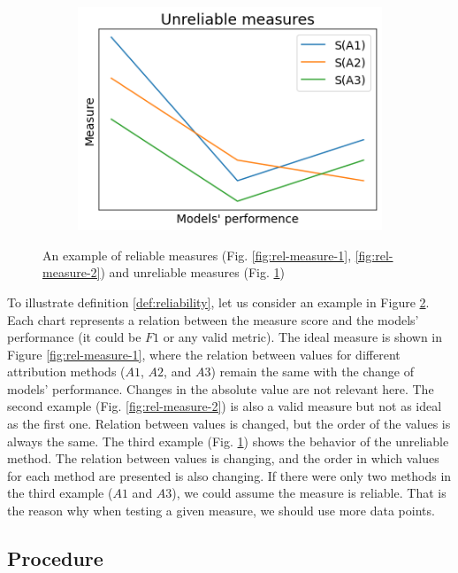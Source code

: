 \begin{figure}[h]
\begin{subfigure}{.3\textwidth}
    \includegraphics[width=\textwidth]{experiments/desc/unrel1.png}
    \caption{}\label{fig:unrel-measure}
\end{subfigure}

 \caption{An example of reliable measures (Fig. \ref{fig:rel-measure-1}, \ref{fig:rel-measure-2}) and unreliable measures (Fig. \ref{fig:unrel-measure})}\label{fig:reliable-measures-example}
\end{figure}

To illustrate definition \ref{def:reliability}, let us consider an example in Figure \ref{fig:reliable-measures-example}. Each chart represents a relation between the measure score and the models' performance (it could be $F1$ or any valid metric). The ideal measure is shown in Figure \ref{fig:rel-measure-1}, where the relation between values for different attribution methods ($A1$, $A2$, and $A3$) remain the same with the change of models' performance. Changes in the absolute value are not relevant here. The second example (Fig. \ref{fig:rel-measure-2}) is also a valid measure but not as ideal as the first one. Relation between values is changed, but the order of the values is always the same. The third example (Fig. \ref{fig:unrel-measure}) shows the behavior of the unreliable method. The relation between values is changing, and the order in which values for each method are presented is also changing. If there were only two methods in the third example ($A1$ and $A3$), we could assume the measure is reliable. That is the reason why when testing a given measure, we should use more data points.

\subsection*{Procedure}

